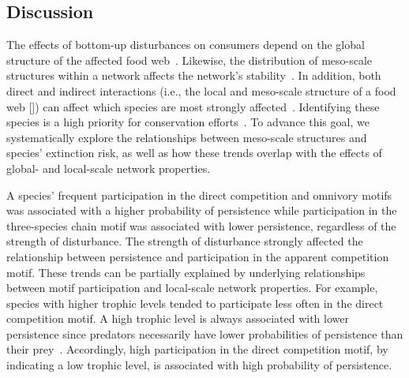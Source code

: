 \documentclass[12pt]{article}
\begin{document}
\begin{spacing}{2.0}


\section*{Discussion}

    The effects of bottom-up disturbances on consumers depend on the global structure of the affected food web~\citep{Dunne2002, Eklof2006, PascualDunne2006}.
    Likewise, the distribution of meso-scale structures within a network affects the network's stability~\citep{prill2005dynamic, bascompte2005simple}.
    In addition, both direct and indirect interactions (i.e., the local and meso-scale structure of a food web  [\citealp[]{Cirtwill2018FoodWebs}]) can affect which species are most strongly affected~\citep{curtsdotter2011robustness, dunne2009cascading, Eklof2006}. 
    Identifying these species is a high priority for conservation efforts~\citep{Bottrilletal2008}.
    To advance this goal, we systematically explore the relationships between meso-scale structures and species' extinction risk, as well as how these trends overlap with the effects of global- and local-scale network properties.

    
    A species' frequent participation in the direct competition and omnivory motifs was associated with a higher probability of persistence while participation in the three-species chain motif was associated with lower persistence, regardless of the strength of disturbance.
    The strength of disturbance strongly affected the relationship between persistence and participation in the apparent competition motif.
    These trends can be partially explained by underlying relationships between motif participation and local-scale network properties.
    For example, species with higher trophic levels tended to participate less often in the direct competition motif.
    A high trophic level is always associated with lower persistence since predators necessarily have lower probabilities of persistence than their prey~\citep{Eklof2013}.
    Accordingly, high participation in the direct competition motif, by indicating a low trophic level, is associated with high probability of persistence.


\end{spacing}
\end{document}
